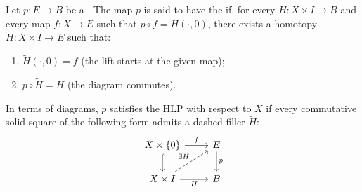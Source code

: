 \begin{definition} \label{definition:homotopy_lifting_property_for_a_continuous_map_of_topological_spaces_with_respect_to_a_topological_space}
    Let $p: E \to B$ be a . 
    The map $p$ is said to have the  if, for every  $H: X \times I \to B$ and every map $f: X \to E$ such that $p \circ f = H(\cdot, 0)$, there exists a homotopy $\tilde{H}: X \times I \to E$ such that:
    \begin{enumerate}
        \item $\tilde{H}(\cdot, 0) = f$ (the lift starts at the given map);
        \item $p \circ \tilde{H} = H$ (the diagram commutes).
    \end{enumerate}

    In terms of diagrams, $p$ satisfies the HLP with respect to $X$ if every commutative solid square of the following form admits a dashed filler $\tilde{H}$:
    \[
    \begin{tikzcd}
    X \times \{0\} \arrow[r, "f"] \arrow[d, hook] & E \arrow[d, "p"] \\
    X \times I \arrow[r, "H"'] \arrow[ur, "\exists \tilde{H}", dashed] & B
    \end{tikzcd}
    \]
\end{definition}